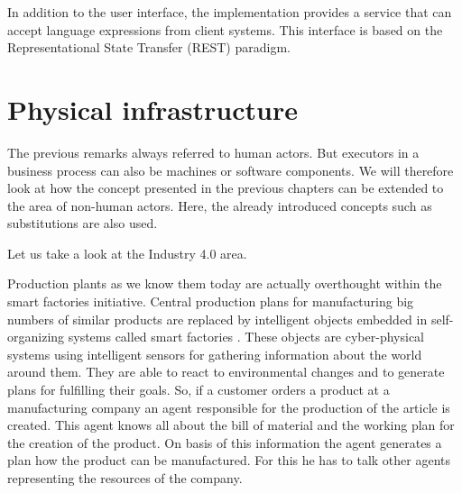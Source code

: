 In addition to the user interface, the implementation provides a service that can accept language expressions from client systems. This interface is based on the Representational State Transfer (REST) paradigm.



\section{Physical infrastructure}


The previous remarks always referred to human actors. But executors in a business process can also be machines or software components. We will therefore look at how the concept presented in the previous chapters can be extended to the area of non-human actors. Here, the already introduced concepts such as substitutions are also used. 

Let us take a look at the Industry 4.0 area. 

Production plants as we know them today are actually overthought within the smart factories initiative. Central production plans for manufacturing big numbers of similar products are replaced by intelligent objects embedded in self-organizing systems called smart factories \cite{Gronau2015}. These objects are cyber-physical systems \cite{meissner2013} using intelligent sensors for gathering information about the world around them.  They are able to react to environmental changes and to generate plans for fulfilling their goals. So, if a customer orders a product at a manufacturing company an agent responsible for the production of the article is created. This agent knows all about the bill of material and the working plan for the creation of the product. On basis of this information the agent generates a plan how the product can be manufactured. For this he has to talk other agents representing the resources of the company. 



